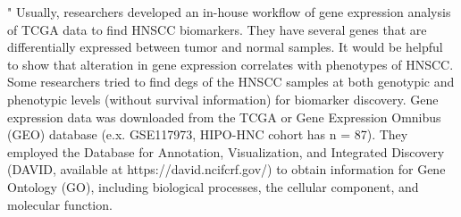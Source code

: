 \documentclass[preprint,12pt]{elsarticle}
\newenvironment{MyIndent}
{\par\leftskip1cm\relax\rightskip1cm\relax}
{\par\leftskip0cm\relax\rightskip0cm\relax}
\newenvironment{MyColorPar}[1]{%
    \leavevmode\color{#1}\ignorespaces%
}{%
}%
\begin{document}
\begin{MyColorPar}{blue}
\begin{MyIndent}
\begin{MyColorPar}{red}
"
Usually, researchers developed an in-house workflow of gene expression analysis of TCGA data to find HNSCC biomarkers.
They have several genes that are differentially expressed between tumor and normal samples.
It would be helpful to show that alteration in gene expression correlates with phenotypes of HNSCC.
Some researchers\cite{Loraine2015a}\cite{Tonella2017a}\cite{Zhao2018}\cite{Li2018a}\cite{Huang2019}\cite{Shen2019}\cite{Schmitt2019}\cite{Xu2021a} tried to find \acrfull{degs} of the HNSCC samples at both genotypic and phenotypic levels (without survival information) for biomarker discovery.
Gene expression data was downloaded from the TCGA or Gene Expression Omnibus (GEO) database (e.x. GSE117973\cite{Schmitt2019}, HIPO-HNC cohort has n = 87).
They employed the Database for Annotation, Visualization, and Integrated Discovery (DAVID, available at https://david.ncifcrf.gov/) to obtain information for Gene Ontology (GO), including biological processes, the cellular component, and molecular function. 

\end{MyColorPar}
\end{MyIndent}
\end{MyColorPar}
\end{document}

